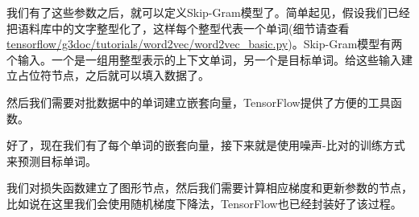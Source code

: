 我们有了这些参数之后，就可以定义Skip-Gram模型了。简单起见，假设我们已经把语料库中的文字整型化了，这样每个整型代表一个单词(细节请查看
\href{https://tensorflow.googlesource.com/tensorflow/+/master/tensorflow/g3doc/tutorials/word2vec/word2vec_basic.py}{tensorflow/g3doc/tutorials/word2vec/word2vec\_basic.py})。Skip-Gram模型有两个输入。一个是一组用整型表示的上下文单词，另一个是目标单词。给这些输入建立占位符节点，之后就可以填入数据了。

\begin{Shaded}
\begin{Highlighting}[]
\OperatorTok{=} \OperatorTok{=}
\OperatorTok{=} \OperatorTok{=}\NormalTok{[batch_size, }\NormalTok{])}
\end{Highlighting}
\end{Shaded}

然后我们需要对批数据中的单词建立嵌套向量，TensorFlow提供了方便的工具函数。

\begin{Shaded}
\begin{Highlighting}[]
\OperatorTok{=} 
\end{Highlighting}
\end{Shaded}

好了，现在我们有了每个单词的嵌套向量，接下来就是使用噪声-比对的训练方式来预测目标单词。

\begin{Shaded}
\begin{Highlighting}[]
\OperatorTok{=} 
\end{Highlighting}
\end{Shaded}

我们对损失函数建立了图形节点，然后我们需要计算相应梯度和更新参数的节点，比如说在这里我们会使用随机梯度下降法，TensorFlow也已经封装好了该过程。

\begin{Shaded}
\begin{Highlighting}[]
\OperatorTok{=} \OperatorTok{=}
\end{Highlighting}
\end{Shaded}

